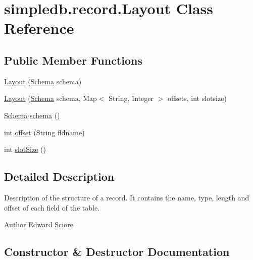 \hypertarget{classsimpledb_1_1record_1_1Layout}{}\section{simpledb.\+record.\+Layout Class Reference}
\label{classsimpledb_1_1record_1_1Layout}
\subsection*{Public Member Functions}
\begin{DoxyCompactItemize}
\item 
\hyperlink{classsimpledb_1_1record_1_1Layout_a2047aa91873cbb1e08d644f1f98ed801}{Layout} (\hyperlink{classsimpledb_1_1record_1_1Schema}{Schema} schema)
\item 
\hyperlink{classsimpledb_1_1record_1_1Layout_a778b97f2859ab75933e86c3bc87d6382}{Layout} (\hyperlink{classsimpledb_1_1record_1_1Schema}{Schema} schema, Map$<$ String, Integer $>$ offsets, int slotsize)
\item 
\hyperlink{classsimpledb_1_1record_1_1Schema}{Schema} \hyperlink{classsimpledb_1_1record_1_1Layout_ab647a930df39704c30501af29df28349}{schema} ()
\item 
int \hyperlink{classsimpledb_1_1record_1_1Layout_abfcef0e0b363f1d075a810bec77ffe57}{offset} (String fldname)
\item 
int \hyperlink{classsimpledb_1_1record_1_1Layout_a1e5e630fd8d2f2695136d9d80fb14b5b}{slot\+Size} ()
\end{DoxyCompactItemize}


\subsection{Detailed Description}
Description of the structure of a record. It contains the name, type, length and offset of each field of the table. \begin{DoxyAuthor}{Author}
Edward Sciore 
\end{DoxyAuthor}


\subsection{Constructor \& Destructor Documentation}
\mbox{\label{classsimpledb_1_1record_1_1Layout_a2047aa91873cbb1e08d644f1f98ed801}} 
